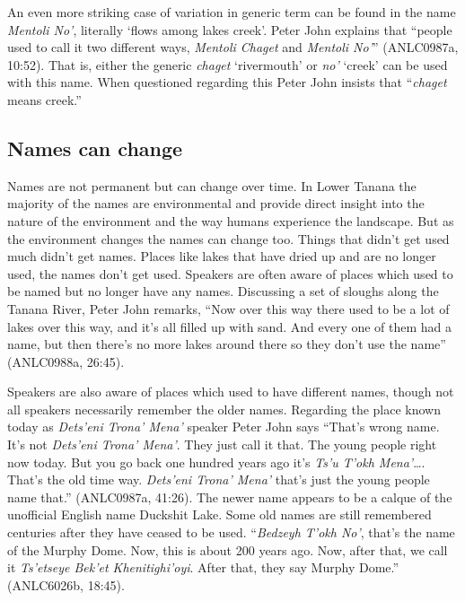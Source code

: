 An even more striking case of variation in generic term can be found in the name \textit{Mentoli No’}, literally ‘flows among lakes creek’. Peter John explains that “people used to call it two different ways, \textit{Mentoli Chaget} and \textit{Mentoli No’}” (ANLC0987a, 10:52). That is, either the generic \textit{chaget} ‘rivermouth’ or \textit{no’} ‘creek’ can be used with this name. When questioned regarding this Peter John insists that “\textit{chaget} means creek.”

\subsection{Names can change}
Names are not permanent but can change over time. In Lower Tanana the majority of the names are environmental and provide direct insight into the nature of the environment and the way humans experience the landscape. But as the environment changes the names can change too. Things that didn’t get used much didn’t get names. Places like lakes that have dried up and are no longer used, the names don’t get used. Speakers are often aware of places which used to be named but no longer have any names. Discussing a set of sloughs along the Tanana River, Peter John remarks, “Now over this way there used to be a lot of lakes over this way, and it’s all filled up with sand. And every one of them had a name, but then there’s no more lakes around there so they don’t use the name” (ANLC0988a, 26:45).

Speakers are also aware of places which used to have different names, though not all speakers necessarily remember the older names. Regarding the place known today as \textit{Dets’eni Trona’ Mena’} speaker Peter John says “That’s wrong name. It’s not \textit{Dets’eni Trona’ Mena’}. They just call it that. The young people right now today. But you go back one hundred years ago it’s \textit{Ts’u T’okh Mena’}…. That’s the old time way. \textit{Dets’eni Trona’ Mena’} that’s just the young people name that.” (ANLC0987a, 41:26). The newer name appears to be a calque of the unofficial English name Duckshit Lake. Some old names are still remembered centuries after they have ceased to be used. “\textit{Bedzeyh T’okh No’}, that’s the name of the Murphy Dome. Now, this is about 200 years ago. Now, after that, we call it \textit{Ts’etseye Bek’et Khenitighi’oyi}. After that, they say Murphy Dome.” (ANLC6026b, 18:45).


